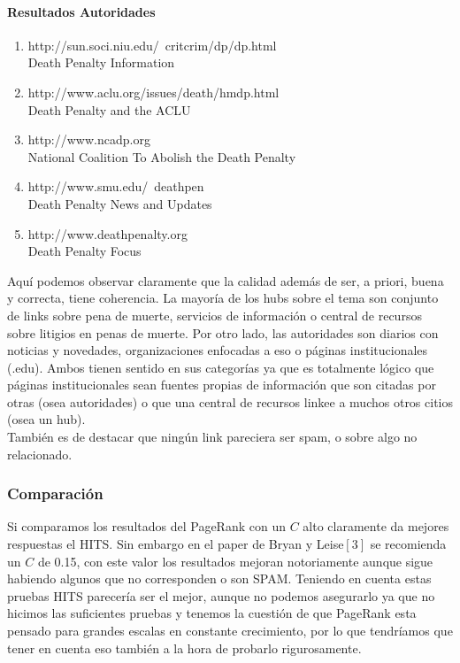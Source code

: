 \paragraph{Resultados Autoridades}
\begin{enumerate}
\item
http://sun.soci.niu.edu/~critcrim/dp/dp.html\\
Death Penalty Information
\item
http://www.aclu.org/issues/death/hmdp.html\\
Death Penalty and the ACLU
\item
http://www.ncadp.org\\
National Coalition To Abolish the Death Penalty
\item
http://www.smu.edu/~deathpen\\
Death Penalty News and Updates
\item
http://www.deathpenalty.org\\
Death Penalty Focus


\end{enumerate}

Aquí podemos observar claramente que la calidad además de ser, a priori, buena y correcta, tiene coherencia. La mayoría de los hubs sobre el tema son conjunto de links sobre pena de muerte, servicios de información o 
central de recursos sobre litigios en penas de muerte. Por otro lado, las autoridades son diarios con noticias y novedades, organizaciones enfocadas a eso o páginas institucionales (.edu). Ambos tienen sentido en sus 
categorías ya que es totalmente lógico que páginas institucionales sean fuentes propias de información que son citadas por otras (osea autoridades) o que una central de recursos linkee a muchos otros citios (osea un hub).\\
También es de destacar que ningún link pareciera ser spam, o sobre algo no relacionado.

\subsubsection{Comparación}

Si comparamos los resultados del PageRank con un $C$ alto claramente da mejores respuestas el HITS. Sin embargo en el paper de Bryan y Leise$[3]$ se recomienda un $C$ de 0.15, con este valor los resultados mejoran notoriamente aunque sigue habiendo algunos que no corresponden o son SPAM. 
Teniendo en cuenta estas pruebas HITS parecería ser el mejor, aunque no podemos asegurarlo ya que no hicimos las suficientes pruebas y tenemos la cuestión de que PageRank esta pensado para grandes escalas en constante crecimiento, por lo que tendríamos que tener en cuenta eso también a la hora de probarlo rigurosamente.

